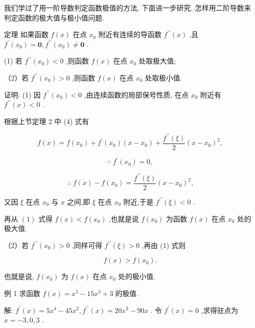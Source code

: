 \documentclass[lang=cn,newtx,10pt,scheme=chinese]{elegantbook}
\begin{document}
我们学过了用一阶导数判定函数极值的方法, 下面进一步研究, 怎样用二阶导数来判定函数的极大值与极小值问题.

定理 如果函数 \(f\left( x\right)\) 在点 \({x}_{0}\) 附近有连续的导函数 \({f}^{\prime \prime }\left( x\right)\) ,且 \({f}^{\prime }\left( {x}_{0}\right) = \mathbf{0},{f}^{\prime \prime }\left( {x}_{0}\right) \neq \mathbf{0}\) .

(1) 若 \({f}^{\prime \prime }\left( {x}_{0}\right) < 0\) ,则函数 \(f\left( x\right)\) 在点 \({x}_{0}\) 处取极大值;

（2）若 \({f}^{\prime \prime }\left( {x}_{0}\right) > 0\) ,则函数 \(f\left( x\right)\) 在点 \({x}_{0}\) 处取极小值.

证明: (1) 因 \({f}^{\prime \prime }\left( {x}_{0}\right) < 0\) ,由连续函数的局部保号性质, 在点 \({x}_{0}\) 附近有 \({f}^{\prime \prime }\left( x\right) < 0\) .

根据上节定理 2 中 (4) 式有

\[
f\left( x\right) = f\left( {x}_{0}\right) + {f}^{\prime }\left( {x}_{0}\right) \left( {x - {x}_{0}}\right) + \frac{{f}^{\prime \prime }\left( \xi \right) }{2}{\left( x - {x}_{0}\right) }^{2},
\]

\[
\because \;{f}^{\prime }\left( {x}_{0}\right) = 0,
\]

\[
\therefore \;f\left( x\right) - f\left( {x}_{0}\right) = \frac{{f}^{\prime \prime }\left( \xi \right) }{2}{\left( x - {x}_{0}\right) }^{2}\text{,} \tag{1}
\]

又因 \(\xi\) 在点 \({x}_{0}\) 与 \(x\) 之间,即 \(\xi\) 在点 \({x}_{0}\) 附近,于是 \({f}^{\prime \prime }\left( \xi \right) < 0\) .

再从 \(\left( 1\right)\) 式得 \(f\left( x\right) < f\left( {x}_{0}\right)\) ,也就是说 \(f\left( {x}_{0}\right)\) 为函数 \(f\left( x\right)\) 在点 \({x}_{0}\) 处的极大值.

（2）若 \({f}^{\prime \prime }\left( {x}_{0}\right) > 0\) ,同样可得 \({f}^{\prime \prime }\left( \xi \right) > 0\) ,再由 (1) 式则

\[
f\left( x\right) > f\left( {x}_{0}\right) \text{.}
\]

也就是说, \(f\left( {x}_{0}\right)\) 为 \(f\left( x\right)\) 在点 \({x}_{0}\) 处的极小值.

例 1 求函数 \(f\left( x\right) = {x}^{5} - {15}{x}^{3} + 3\) 的极值.

解: \({f}^{\prime }\left( x\right) = 5{x}^{4} - {45}{x}^{2},{f}^{\prime \prime }\left( x\right) = {20}{x}^{3} - {90x}\) . 令 \({f}^{\prime }\left( x\right) = 0\) ,求得驻点为 \(x = - 3,0,3\) .
\end{document}
